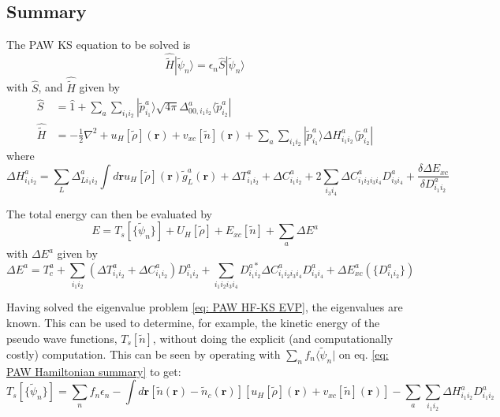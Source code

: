 \documentclass[a4paper]{article}
\newcommand{\s}[1]{\tilde{#1}}
\newcommand{\ws}[1]{\widetilde{#1}}
\newcommand{\h}[1]{\hat{#1}}
\newcommand{\wh}[1]{\widehat{#1}}
\newcommand{\br}{\mathbf{r}}
\newcommand{\bra}[1]{\langle #1 |}
\newcommand{\ket}[1]{| #1 \rangle}
\begin{document}
\subsection{Summary}\label{sec: summary exx hamiltonian}
The PAW KS equation to be solved is
%
\begin{equation}\label{eq: PAW HF-KS EVP}
  \wh{\ws{H}} \ket{\s{\psi}_n}= \epsilon_n \h{S} \ket{\s{\psi}_n}
\end{equation}
%
with $\h{S}$, and $\wh{\ws{H}}$ given by
%
\begin{subequations}
\begin{align}
\wh{S} &= \h{1} + \sum_a \sum_{i_1i_2} \ket{\s{p}_{i_1}^a}\sqrt{4\pi}\Delta^a_{00,i_1i_2}\bra{\s{p}_{i_2}^a}\\
\wh{\ws{H}} &= -\tfrac{1}{2}\nabla^2 + u_H[\s{\rho}](\br) + v_{xc}[\s{n}](\br) + \sum_a \sum_{i_1i_2} \ket{\s{p}^a_{i_1}} \Delta H^a_{i_1i_2} \bra{\s{p}^a_{i_2}}\label{eq: PAW Hamiltonian summary}
\end{align}
\end{subequations}
%
where
%
\begin{equation}
    \Delta H^a_{i_1i_2} = \sum_L \Delta^a_{Li_1i_2} \int d\br u_H[\s{\rho}](\br)\s{g}^a_L(\br) + \Delta T^a_{i_1i_2} + \Delta C^a_{i_1i_2} + 2\sum_{i_3i_4} \Delta C^a_{i_1i_2i_3i_4}D^a_{i_3i_4} + \frac{\delta \Delta E_{xc}}{\delta D^a_{i_1i_2}}
\end{equation}
%
\par The total energy can then be evaluated by
%
\begin{equation}
  E = T_s[\{\s{\psi}_n\}] + U_H[\s{\rho}] + E_{xc}[\s{n}] + \sum_a \Delta E^a
\end{equation}
%
with $\Delta E^a$ given by
%
\begin{equation}
 \Delta E^a = T_c^a + \sum_{i_1i_2} \left( \Delta T^a_{i_1i_2} + \Delta C^a_{i_1i_2}\right) D_{i_1i_2}^a + \sum_{i_1i_2i_3i_4}D_{i_1i_2}^{a*} \Delta C_{i_1i_2i_3i_4}^a D_{i_3i_4}^a + \Delta E_{xc}^a(\{D_{i_1i_2}^a\})
\end{equation}
%
\par Having solved the eigenvalue problem \ref{eq: PAW HF-KS EVP},
the eigenvalues are known. This can be used to determine, for example,
the kinetic energy of the pseudo wave functions, $T_s[\s{n}]$, without
doing the explicit (and computationally costly) computation. This can
be seen by operating with $\sum_n f_n \bra{\s{\psi}_n}$ on eq.
\ref{eq: PAW Hamiltonian summary} to get:
%
\begin{equation}
  \label{eq:kinetic-energy}
  T_s[\{\s{\psi}_n\}] = \sum_n f_n \epsilon_n - \int d\br [\s{n}(\br) - \s{n}_c(\br)] \left[u_H[\s{\rho}](\br) + v_{xc}[\s{n}](\br)\right] - \sum_a \sum_{i_1i_2} \Delta H^a_{i_1i_2} D^a_{i_1i_2}
\end{equation}
\end{document}
